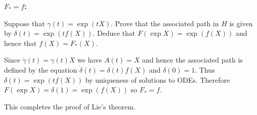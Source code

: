 \documentclass[12pt]{article}
\begin{document}
{\bf $F_*=f$:}

\begin{question}
Suppose that $\gamma(t)=\exp(tX)$. Prove that the associated path in $H$ is given by $\delta(t)=\exp(tf(X))$. Deduce that $F(\exp X)=\exp(f(X))$ and hence that $f(X)=F_*(X)$.
\end{question}

\begin{answer}
Since $\dot{\gamma}(t)=\gamma(t)X$ we have $A(t)=X$ and hence the associated path is defined by the equation $\dot{\delta}(t)=\delta(t)f(X)$ and $\delta(0)=1$. Thus $\delta(t)=\exp(tf(X))$ by uniqueness of solutions to ODEs. Therefore $F(\exp X)=\delta(1)=\exp(f(X))$ so $F_*=f$.
\end{answer}

This completes the proof of Lie's theorem. \qedhere
\end{document}
